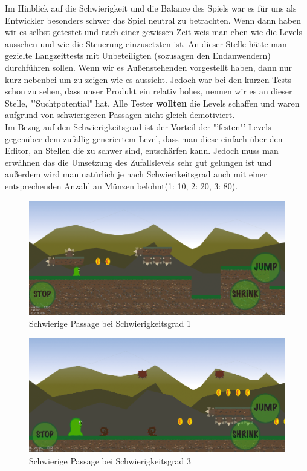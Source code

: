 Im Hinblick auf die Schwierigkeit und die Balance des Spiels war es für uns als Entwickler besonders schwer das Spiel neutral zu betrachten. Wenn dann haben wir es selbst getestet und nach einer gewissen Zeit weis man eben wie die Levels aussehen und wie die Steuerung einzusetzten ist. An dieser Stelle hätte man gezielte Langzeittests mit Unbeteiligten (sozusagen den Endanwendern) durchführen sollen. Wenn wir es Außenstehenden vorgestellt haben, dann nur kurz nebenbei um zu zeigen wie es aussieht.
Jedoch war bei den kurzen Tests schon zu sehen, dass unser Produkt ein relativ hohes, nennen wir es an dieser Stelle, "'Suchtpotential" hat. Alle Tester \textbf{wollten} die Levels schaffen und waren aufgrund von schwierigeren Passagen nicht gleich demotiviert.
\\Im Bezug auf den Schwierigkeitsgrad ist der Vorteil der "'festen"' Levels gegenüber dem zufällig generiertem Level, dass man diese einfach über den Editor, an Stellen die zu schwer sind, entschärfen kann. Jedoch muss man erwähnen das die Umsetzung des Zufallslevels sehr gut gelungen ist und außerdem wird man natürlich je nach Schwierikeitsgrad auch mit einer entsprechenden Anzahl an Münzen belohnt(1: 10, 2: 20, 3: 80).

\begin{figure}[H]
\centering
\includegraphics[width=12cm]{resources/randomdiff1}
\caption{Schwierige Passage bei Schwierigkeitsgrad 1}
\label{fig: randomdiff1}
\end{figure}


\begin{figure}[H]
\centering
\includegraphics[width=12cm]{resources/randomdiff3}
\caption{Schwierige Passage bei Schwierigkeitsgrad 3}
\label{fig: randomdiff3}
\end{figure}

